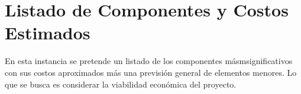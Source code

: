 \section{Listado de Componentes y Costos Estimados}
\color{blue}En esta instancia se pretende un listado de los componentes másmsignificativos con sus costos aproximados más una previsión general de elementos menores. Lo que se busca es considerar la viabilidad económica del proyecto.\color{black}



